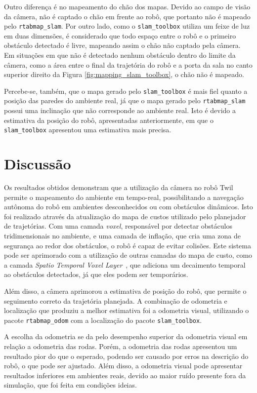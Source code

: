 \documentclass[repeatfields,xlists,xpacks,oneside,yearsonly]{ufrgscca}
\begin{document}
Outro diferença é no mapeamento do chão dos mapas. Devido ao campo de
visão da câmera, não é captado o chão em frente ao robô, que portanto
não é mapeado pelo \texttt{rtabmap\_slam}. Por outro lado, como o
\texttt{slam\_toolbox} utiliza um feixe de luz em duas dimensões, é
considerado que todo espaço entre o robô e o primeiro obstáculo
detectado é livre, mapeando assim o chão não captado pela câmera. Em
situações em que não é detectado nenhum obstáculo dentro do limite da
câmera, como a área entre o final da trajetória do robô e a porta da
sala no canto superior direito da Figura
\ref{fig:mapping_slam_toolbox}, o chão não é mapeado.

Percebe-se, também, que o mapa gerado pelo \texttt{slam\_toolbox} é
mais fiel quanto a posição das paredes do ambiente real, já que o
mapa gerado pelo \texttt{rtabmap\_slam} possui uma inclinação que não
corresponde ao ambiente real. Isto é devido a estimativa da posição
do robô, apresentadas anteriormente, em que o \texttt{slam\_toolbox}
apresentou uma estimativa mais precisa.

\chapter{Discussão}
\label{discussao}

Os resultados obtidos demonstram que a utilização da câmera no robô
Twil permite o mapeamento do ambiente em tempo-real, possibilitando a
navegação autônoma do robô em ambientes desconhecidos ou com
obstáculos dinâmicos. Isto foi realizado através da atualização do
mapa de custos utilizado pelo planejador de trajetórias. Com uma
camada \textit{voxel}, responsável por detectar obstáculos
tridimensionais no ambiente, e uma camada de inflação, que cria uma
zona de segurança ao redor dos obstáculos, o robô é capaz de evitar
colisões. Este sistema pode ser aprimorado com a utilização de outras
camadas do mapa de custo, como a camada \textit{Spatio Temporal Voxel
    Layer}~\cite{stlv_article}, que adiciona um decaimento temporal ao
obstáculos detectados, já que eles podem ser temporários.

Além disso, a câmera aprimorou a estimativa de posição do robô, que
permite o seguimento correto da trajetória planejada. A combinação de
odometria e localização que produziu a melhor estimativa foi a
odometria visual, utilizando o pacote \texttt{rtabmap\_odom} com a
localização do pacote \texttt{slam\_toolbox}.

A escolha da odometria se da pelo desempenho superior da odometria
visual em relação a odometria das rodas. Porém, a odometria das rodas
apresentou um resultado pior do que o esperado, podendo ser causado
por erros na descrição do robô, o que pode ser ajustado. Além disso,
a odometria visual pode apresentar resultados inferiores em ambientes
reais, devido ao maior ruído presente fora da simulação, que foi
feita em condições ideias.
\end{document}
